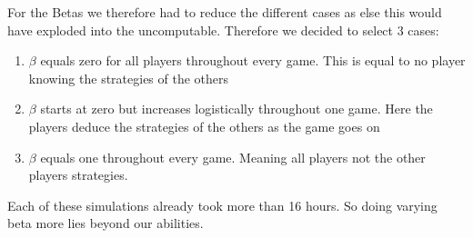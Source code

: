 For the Betas we therefore had to reduce the different cases as else this would have exploded into the uncomputable. Therefore we decided to select 3 cases:
\begin{enumerate}
\item $\beta$ equals zero for all players throughout every game. This is equal to no player knowing the strategies of the others
\item $\beta$ starts at zero but increases logistically throughout one game. Here the players deduce the strategies of the others as the game goes on
\item $\beta$ equals one throughout every game. Meaning all players not the other players strategies.
\end{enumerate}
Each of these simulations already took more than 16 hours. So doing varying beta more lies beyond our abilities. 

